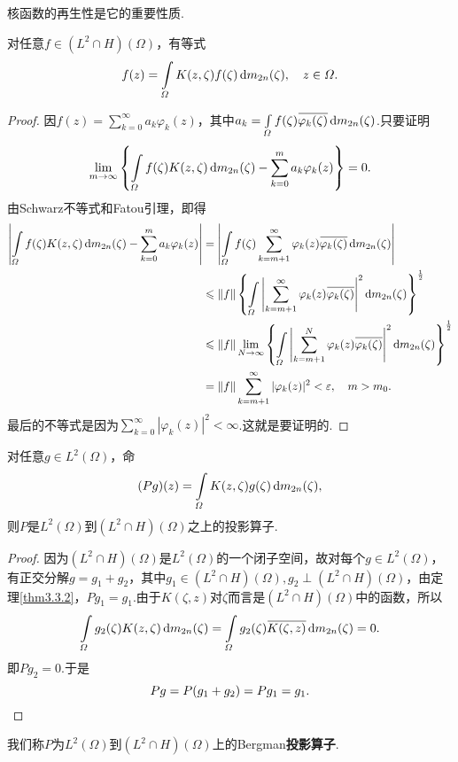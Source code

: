 核函数的再生性是它的重要性质.
\begin{theorem}\label{thm3.3.2}
	对任意$f\in(L^2\cap H)(\Omega)$，有等式
	\[f(z)=\int\limits_\varOmega K(z,\zeta)f(\zeta)\mathop{}\!\mathrm{d} m_{2n}(\zeta),\quad z\in\varOmega.\]
\end{theorem}
\begin{proof}
	因$f(z)=\sum\limits_{k=0}^\infty a_k\varphi_k(z)$，其中$a_k=\int\limits_\varOmega f(\zeta){}\mkern1mu\overline{\mkern-1mu\varphi_k(\zeta)}\mathop{}\!\mathrm{d} m_{2n}(\zeta)$.只要证明
	\[\lim_{m\to\infty}\left\{\int\limits_\varOmega f(\zeta)K(z,\zeta)\mathop{}\!\mathrm{d} m_{2n}(\zeta)-\sum_{k=0}^{m}a_k\varphi_k(z)\right\}=0.\]
	由Schwarz不等式和Fatou引理，即得
	\begin{align*}
		\left|\int\limits_\varOmega f(\zeta)K(z,\zeta)\mathop{}\!\mathrm{d} m_{2n}(\zeta)-\sum_{k=0}^{m}a_k\varphi_k(z)\right|
		&=\left|\int\limits_\varOmega f(\zeta)\sum_{k=m+1}^{\infty}\varphi_k(z){}\mkern1mu\overline{\mkern-1mu\varphi_k(\zeta)}\mathop{}\!\mathrm{d} m_{2n}(\zeta)\right|\\
		&\leqslant\Vert f\Vert\left\{\int\limits_\varOmega\left|\sum_{k=m+1}^{\infty}\varphi_k(z){}\mkern1mu\overline{\mkern-1mu\varphi_k(\zeta)}\right|^2\mathop{}\!\mathrm{d} m_{2n}(\zeta)\right\}^{\frac12}\\
		&\leqslant \Vert f\Vert\lim_{N\to\infty}\left\{\int\limits_\varOmega\left|\sum_{k=m+1}^{N}\varphi_k(z){}\mkern1mu\overline{\mkern-1mu\varphi_k(\zeta)}\right|^2\mathop{}\!\mathrm{d} m_{2n}(\zeta)\right\}^{\frac12}\\
		&=\Vert f\Vert \sum_{k=m+1}^{\infty}|\varphi_k(z)|^2<\varepsilon,\quad m>m_0.
	\end{align*}
最后的不等式是因为$\sum\limits_{k=0}^\infty|\varphi_k(z)|^2<\infty$.这就是要证明的.
\end{proof}
\begin{corollary}\label{cor3.3.3}
	对任意$g\in L^2(\Omega)$，命
	\[(Pg)(z)=\int\limits_\varOmega K(z,\zeta)g(\zeta)\mathop{}\!\mathrm{d} m_{2n}(\zeta),\]
	则$P$是$L^2(\Omega)$到$(L^2\cap H)(\Omega)$之上的投影算子.
\end{corollary}
\begin{proof}
	因为$(L^2\cap H)(\Omega)$是$L^2(\Omega)$的一个闭子空间，故对每个$g\in L^2(\Omega)$，有正交分解$g=g_1+g_2$，其中$g_1\in(L^2\cap H)(\Omega),g_2\perp(L^2\cap H)(\Omega)$，由定理\ref{thm3.3.2}，$Pg_1=g_1$.由于$K(\zeta,z)$对$\zeta$而言是$(L^2\cap H)(\Omega)$中的函数，所以
	\[\int\limits_\varOmega g_2(\zeta)K(z,\zeta)\mathop{}\!\mathrm{d} m_{2n}(\zeta)=\int\limits_\varOmega g_2(\zeta){}\mkern1mu\overline{\mkern-1muK(\zeta,z)}\mathop{}\!\mathrm{d} m_{2n}(\zeta)=0.\]
	即$Pg_2=0$.于是
	\[Pg=P(g_1+g_2)=Pg_1=g_1.\qedhere\]
\end{proof}
我们称$P$为$L^2(\Omega)$到$(L^2\cap H)(\Omega)$上的Bergman\textbf{投影算子}.

